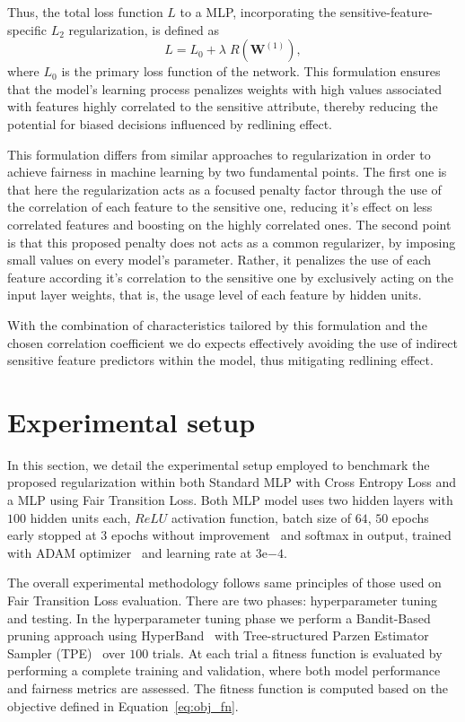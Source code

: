 Thus, the total loss function $L$ to a MLP, incorporating the sensitive-feature-specific $L_2$ regularization, is defined as
\begin{equation}\label{eq:total_regularized_loss}
L = L_0 + \lambda \; R(\mathbf{W}^{(1)}),
\end{equation}
where $L_0$ is the primary loss function of the network. This formulation ensures that the model's learning process penalizes weights with high values associated with features highly correlated to the sensitive attribute, thereby reducing the potential for biased decisions influenced by redlining effect.

This formulation differs from similar approaches to regularization in order to achieve fairness in machine learning by two fundamental points.  The first one is that here the regularization acts as a focused penalty factor through the use of the correlation of each feature to the sensitive one, reducing it's effect on less correlated features and boosting on the highly correlated ones. The second point is that this proposed penalty does not acts as a common regularizer, by imposing small values on every model's parameter. Rather, it penalizes the use of each feature according it's correlation to the sensitive one by exclusively acting on the input layer weights, that is, the usage level of each feature by hidden units.

With the combination of characteristics tailored by this formulation and the chosen correlation coefficient we do expects effectively avoiding the use of indirect sensitive feature predictors within the model, thus mitigating redlining effect.

\section{Experimental setup}

In this section, we detail the experimental setup employed to benchmark the proposed regularization within both Standard MLP with Cross Entropy Loss and a MLP using Fair Transition Loss. Both MLP model uses two hidden layers with $100$ hidden units each, $ReLU$ activation function, batch size of $64$, $50$ epochs early stopped at $3$ epochs without improvement~\citep{Li2020} and softmax in output, trained with ADAM optimizer~\citep{KingmaB14} and learning rate at $3\mathrm{e}{-4}$. 

The overall experimental methodology follows same principles of those used on Fair Transition Loss evaluation. There are two phases: hyperparameter tuning and testing. In the hyperparameter tuning phase we perform a Bandit-Based pruning approach using HyperBand~\citep{Li2018} with Tree-structured Parzen Estimator Sampler (TPE)~\citep{bergstra2011} over $100$ trials. At each trial a fitness function is evaluated by performing a complete training and validation, where both model performance and fairness metrics are assessed. The fitness function is computed based on the objective defined in Equation~\ref{eq:obj_fn}. 

